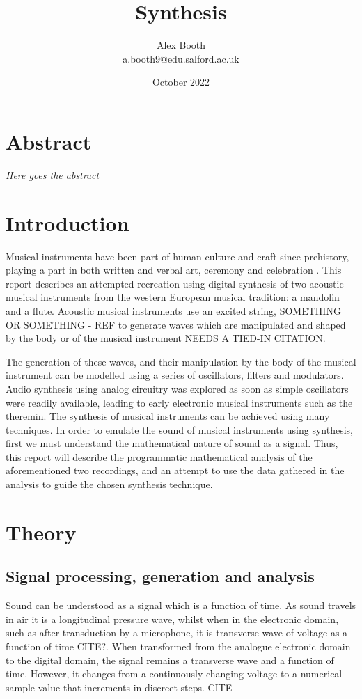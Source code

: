 \documentclass{article}
\title{Synthesis}
\author{Alex Booth\\ a.booth9@edu.salford.ac.uk}
\date{October 2022}
\begin{document}
\maketitle
\section{Abstract}
    \textit{Here goes the abstract}
\newpage
\tableofcontents
\newpage

\section{Introduction}
    Musical instruments have been part of human culture and craft since prehistory, playing a part in both written and verbal art, ceremony and celebration \cite{rault}.
    This report describes an attempted recreation using digital synthesis of two acoustic musical instruments from the western European musical tradition: a mandolin and a flute.
    Acoustic musical instruments use an excited string, SOMETHING OR SOMETHING - REF to generate waves which are manipulated and shaped by the body or of the musical instrument NEEDS A TIED-IN CITATION. %
    
    The generation of these waves, and their manipulation by the body of the musical instrument can be modelled using a series of oscillators, filters and modulators.
    Audio synthesis using analog circuitry was explored as soon as simple oscillators were readily available, leading to early electronic musical instruments such as the theremin.  %
    The synthesis of musical instruments can be achieved using many techniques.
    In order to emulate the sound of musical instruments using synthesis, first we must understand the mathematical nature of sound as a signal.
    Thus, this report will describe the programmatic mathematical analysis of the aforementioned two recordings, and an attempt to use the data gathered in the analysis to guide the chosen synthesis technique. 
    

\section{Theory}
    \subsection{Signal processing, generation and analysis}
        Sound can be understood as a signal which is a function of time.
        As sound travels in air it is a longitudinal pressure wave, whilst when in the electronic domain, such as after transduction by a microphone, it is transverse wave of voltage as a function of time CITE?.
        When transformed from the analogue electronic domain to the digital domain, the signal remains a transverse wave and a function of time.
        However, it changes from a continuously changing voltage to a numerical sample value that increments in discreet steps. CITE
        
\end{document}
